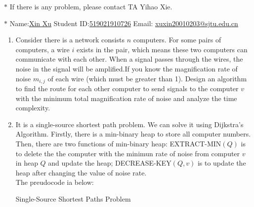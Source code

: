 \documentclass[12pt,a4paper]{article}
\makeatletter
\newtheorem*{solution}{Solution}
\theoremstyle{definition}
\renewenvironment{solution}[1][Solution] {\par\pushQED{\qed}\normalfont\topsep6\p@\@plus6\p@\relax\trivlist\item[\hskip\labelsep\bfseries#1\@addpunct{.}]\ignorespaces}{\popQED\endtrivlist\@endpefalse} \makeatother
\makeatother
\begin{document}
\noindent

\noindent{}
\begin{center}
\footnotesize{\color{red}$*$ If there is any problem, please contact TA Yihao Xie. }

\footnotesize{\color{blue}$*$ Name:\underline{Xin Xu}  \quad Student ID:\underline{519021910726} \quad Email: \underline{xuxin20010203@sjtu.edu.cn}}
\end{center}

\begin{enumerate}
    \item  Consider there is a network consists $n$ computers. For some pairs of computers, a wire $i$ exists in the pair, which means these two computers can communicate with each other. When a signal passes through the wires, the noise in the signal will be amplified.If you know the magnification rate of noise $m_{i,j}$ of each wire (which must be greater than 1). Design an algorithm to find the route  for each other computer to send signals to the computer $v$ with the minimum total magnification rate of noise and analyze the time complexity.
	
	\begin{solution}
		It is a single-source shortest path problem. We can solve it using Dijkstra's Algorithm. Firstly, there is a min-binary heap to store all computer numbers. Then, there are two functions of min-binary heap: EXTRACT-MIN$(Q)$ is to delete the the computer with the minimun rate of noise from computer $v$ in heap $Q$ and update the heap; DECREASE-KEY$(Q,v)$ is to update the heap after changing the value of noise rate.\\
		The preudocode ia below:\\
		\begin{algorithm}[H]
            
            \BlankLine
            \caption{Single-Source Shortest Paths Problem}\label{Alg-Single-Source Shortest Paths}



\end{algorithm}
\end{solution}
\end{enumerate}
\end{document}
